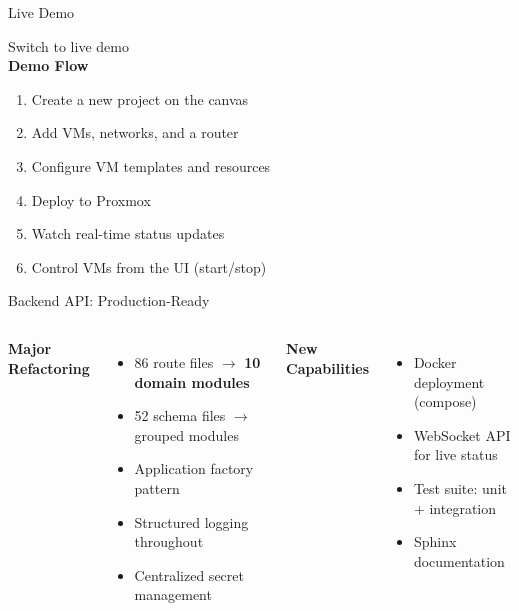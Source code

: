 \documentclass[aspectratio=169]{beamer}
\begin{document}
\begin{frame}{Live Demo \; \faPlay}
  \begin{center}
    {\Large \faDesktop\quad Switch to live demo}\\[8mm]
    \textbf{Demo Flow}\\[4mm]
    \begin{enumerate}
      \item Create a new project on the canvas
      \item Add VMs, networks, and a router
      \item Configure VM templates and resources
      \item Deploy to Proxmox
      \item Watch real-time status updates
      \item Control VMs from the UI (start/stop)
    \end{enumerate}
  \end{center}
\end{frame}

\begin{frame}{Backend API: Production-Ready \; \faCogs}
  \begin{columns}[T]
    \textbf{Major Refactoring}
    \begin{itemize}
      \item 86 route files $\rightarrow$ \textbf{10 domain modules}
      \item 52 schema files $\rightarrow$ grouped modules
      \item Application factory pattern
      \item Structured logging throughout
      \item Centralized secret management
    \end{itemize}

    \textbf{New Capabilities}
    \begin{itemize}
      \item \alert{Docker deployment} (compose)
      \item \alert{WebSocket API} for live status
      \item \alert{Test suite}: unit + integration
      \item \alert{Sphinx documentation}
    \end{itemize}
  \end{columns}
\end{frame}
\end{document}
